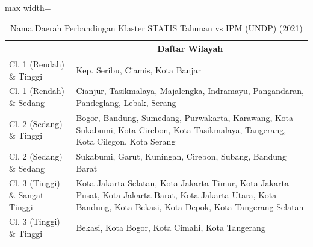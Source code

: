 \begin{table}[H]
\centering
\caption{Nama Daerah Perbandingan Klaster STATIS Tahunan vs IPM (UNDP) (2021)} \label{tab:app1statis_ipm_name_2021}
\begin{adjustbox}{max width=\textwidth}
\begin{tabular}{|>{\centering\arraybackslash}p{4cm}|p{10cm}|}
\hline
\multicolumn{1}{|c|}{\textbf{Kategori}} & \multicolumn{1}{c|}{\textbf{Daftar Wilayah}} \\
\hline
Cl. 1 (Rendah) \& Tinggi & Kep. Seribu, Ciamis, Kota Banjar \\
\hline
Cl. 1 (Rendah) \& Sedang & Cianjur, Tasikmalaya, Majalengka, Indramayu, Pangandaran, Pandeglang, Lebak, Serang \\
\hline
Cl. 2 (Sedang) \& Tinggi & Bogor, Bandung, Sumedang, Purwakarta, Karawang, Kota Sukabumi, Kota Cirebon, Kota Tasikmalaya, Tangerang, Kota Cilegon, Kota Serang \\
\hline
Cl. 2 (Sedang) \& Sedang & Sukabumi, Garut, Kuningan, Cirebon, Subang, Bandung Barat \\
\hline
Cl. 3 (Tinggi) \& Sangat Tinggi & Kota Jakarta Selatan, Kota Jakarta Timur, Kota Jakarta Pusat, Kota Jakarta Barat, Kota Jakarta Utara, Kota Bandung, Kota Bekasi, Kota Depok, Kota Tangerang Selatan \\
\hline
Cl. 3 (Tinggi) \& Tinggi & Bekasi, Kota Bogor, Kota Cimahi, Kota Tangerang \\
\hline
\end{tabular}
\end{adjustbox}
\end{table}